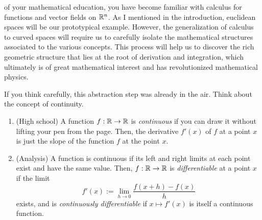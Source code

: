  of your mathematical education, you have become familiar with calculus for functions and vector fields on $\mathbb{R}^n$.
As I mentioned in the introduction, euclidean spaces will be our prototypical example.
However, the generalization of calculus to curved spaces will require us to carefully isolate the mathematical structures associated to the various concepts.
This process will help us to discover the rich geometric structure that lies at the root of derivation and integration, which ultimately is of great mathematical interest and has revolutionized mathematical physics.

If you think carefully, this abstraction step was already in the air. Think about the concept of continuity.

\begin{enumerate}
  \item (High school) A function $f:\mathbb{R}\to\mathbb{R}$ is \emph{continuous} if you can draw it without lifting your pen from the page.
        Then, the derivative $f'(x)$ of $f$ at a point $x$ is just the slope of the function $f$ at the point $x$.

  \item (Analysis) A function is continuous if its left and right limits at each point exist and have the same value.
        Then, $f:\mathbb{R}\to\mathbb{R}$ is \emph{differentiable} at a point $x$ if the limit
        \begin{equation}
          f'(x) := \lim_{h\to0} \frac{f(x+h) - f(x)}{h}
        \end{equation}
        exists, and is \emph{continuously differentiable} if $x\mapsto f'(x)$ is itself a continuous function.


\end{enumerate}
